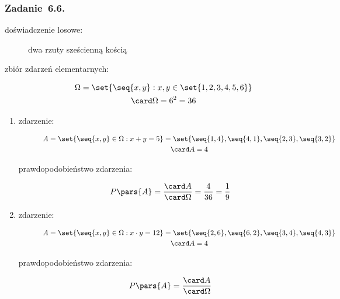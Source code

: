 \subsubsection*{Zadanie~6.6.}
\begin{description}
    \item[doświadczenie losowe:] dwa rzuty sześcienną kością
    \item[zbiór zdarzeń elementarnych:]
        \begin{gather*}
            \Omega = \set{\seq{x, y} : x, y \in \set{1, 2, 3, 4, 5, 6}}\\
            \card\Omega = 6^2 = 36
        \end{gather*}
\end{description}
\begin{enumerate}[label={\alph*)}]
    \item
        \begin{description}
            \item[zdarzenie:]
                \begin{gather*}
                    A = \set{\seq{x, y} \in \Omega : x + y = 5}
                        = \set{\seq{1, 4}, \seq{4, 1}, \seq{2, 3}, \seq{3, 2}}\\
                    \card A = 4
                \end{gather*}
            \item[prawdopodobieństwo zdarzenia:]
                \begin{equation*}
                    P\pars{A}
                        = \frac{\card A}{\card\Omega}
                        = \frac{4}{36}
                        = \frac{1}{9}
                \end{equation*}
        \end{description}
    \item
        \begin{description}
            \item[zdarzenie:]
                \begin{gather*}
                    A = \set{\seq{x, y} \in \Omega : x \cdot y = 12}
                        = \set{\seq{2, 6}, \seq{6, 2}, \seq{3, 4}, \seq{4, 3}}\\
                    \card A = 4
                \end{gather*}
            \item[prawdopodobieństwo zdarzenia:]
                \begin{equation*}
                    P\pars{A}
                        = \frac{\card A}{\card\Omega}

\end{equation*}
\end{description}
\end{enumerate}
